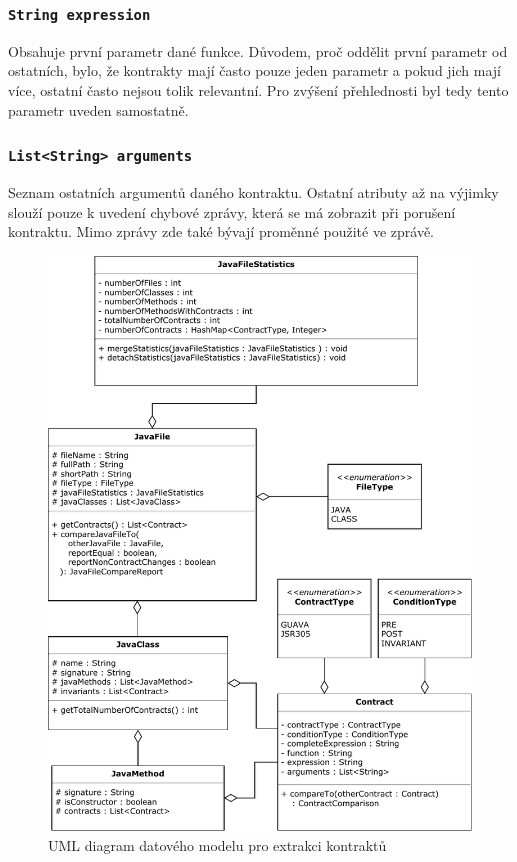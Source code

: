 				\subsubsection{\texttt{String expression}} 
					Obsahuje první parametr dané funkce. Důvodem, proč oddělit první parametr od ostatních, bylo, že kontrakty mají často pouze jeden parametr a pokud jich mají více, ostatní často nejsou tolik relevantní. Pro zvýšení přehlednosti byl tedy tento parametr uveden samostatně.
			
				\subsubsection{\texttt{List<String> arguments}} 
					Seznam ostatních argumentů daného kontraktu. Ostatní atributy až na výjimky slouží pouze k uvedení chybové zprávy, která se má zobrazit při porušení kontraktu. Mimo zprávy zde také bývají proměnné použité ve zprávě.\\					
	
				
				\begin{figure}[!htb]
						\centering
						\includegraphics[width=1\textwidth]{img/modelExtractorDiagram.pdf}
						\caption[modelExtractorDiagram]{UML diagram datového modelu pro extrakci kontraktů}
						\label{modelExtractorDiagram}
					\endminipage\hfill
				\end{figure}				
					

